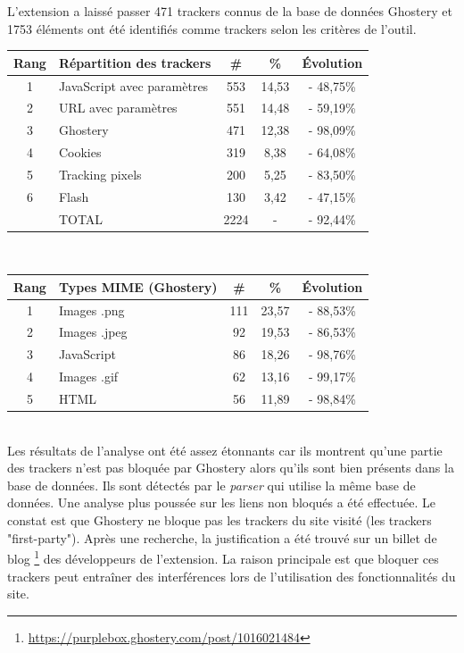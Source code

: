 L'extension a laissé passer 471 trackers connus de la base de données Ghostery et 1753 éléments ont été identifiés comme trackers selon les critères de l'outil.\\

\begin{tabular}{ c | p{5cm} | c | c || c | }
   Rang & Répartition des trackers & \# & \% & Évolution \\
   \hline
   \hline
   1 & JavaScript avec paramètres & 553 & 14,53 & - 48,75\% \\
   2 & URL avec paramètres & 551 & 14,48 & - 59,19\% \\
   3 & Ghostery & 471 & 12,38 & - 98,09\% \\
   4 & Cookies & 319 & 8,38 & - 64,08\% \\
   5 & Tracking pixels & 200 & 5,25 & - 83,50\% \\
   6 & Flash & 130 & 3,42 & - 47,15\% \\
   \hline
    & TOTAL & 2224 & - & - 92,44\%\\
   \hline
\end{tabular}
\\[1cm]

\begin{tabular}{ c | p{5cm} | c | c | c | }
   Rang & Types MIME (Ghostery) & \# & \% & Évolution\\
   \hline
   \hline
   1 & Images .png & 111 & 23,57 & - 88,53\% \\
   2 & Images .jpeg & 92 & 19,53 & - 86,53\% \\
   3 & JavaScript & 86 & 18,26 & - 98,76\% \\
   4 & Images .gif & 62 & 13,16 & - 99,17\% \\
   5 & HTML & 56 & 11,89 & - 98,84\% \\
   \hline
\end{tabular}
\\[.3cm]

Les résultats de l'analyse ont été assez étonnants car ils montrent qu'une partie des trackers n'est pas bloquée par Ghostery alors qu'ils sont bien présents dans la base de données. Ils sont détectés par le \textit{parser} qui utilise la même base de données. Une analyse plus poussée sur les liens non bloqués a été effectuée. Le constat est que Ghostery ne bloque pas les trackers du site visité (les trackers "first-party"). Après une recherche, la justification a été trouvé sur un billet de blog \footnote{\url{https://purplebox.ghostery.com/post/1016021484}} des développeurs de l'extension. La raison principale est que bloquer ces trackers peut entraîner des interférences lors de l'utilisation des fonctionnalités du site.
\newline


